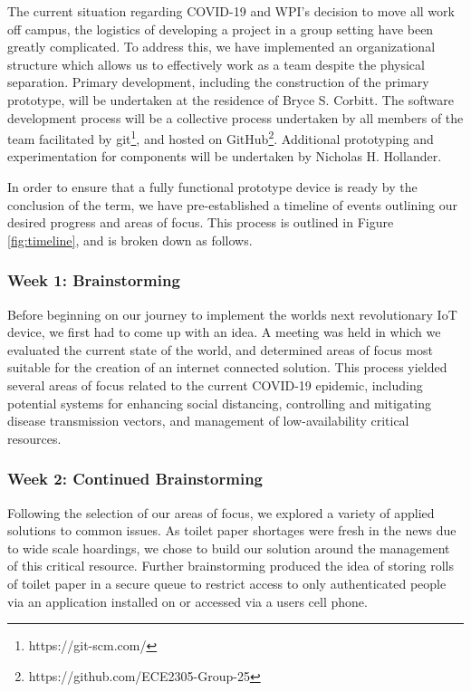 
\par The current situation regarding COVID-19 and WPI's decision to move all work off campus, the logistics of developing a project in a group setting have been greatly complicated.  To address this, we have implemented an organizational structure which allows us to effectively work as a team despite the physical separation.  Primary development, including the construction of the primary prototype, will be undertaken at the residence of Bryce S. Corbitt.  The software development process will be a collective process undertaken by all members of the team facilitated by git\footnote{https://git-scm.com/}, and hosted on GitHub\footnote{https://github.com/ECE2305-Group-25}.  Additional prototyping and experimentation for components will be undertaken by Nicholas H. Hollander.

\par In order to ensure that a fully functional prototype device is ready by the conclusion of the term, we have pre-established a timeline of events outlining our desired progress and areas of focus.  This process is outlined in Figure \ref{fig:timeline}, and is broken down as follows.


\subsubsection*{Week 1: Brainstorming}
\par Before beginning on our journey to implement the worlds next revolutionary IoT device, we first had to come up with an idea.  A meeting was held in which we evaluated the current state of the world, and determined areas of focus most suitable for the creation of an internet connected solution.  This process yielded several areas of focus related to the current COVID-19 epidemic, including potential systems for enhancing social distancing, controlling and mitigating disease transmission vectors, and management of low-availability critical resources.

\subsubsection*{Week 2: Continued Brainstorming}
\par Following the selection of our areas of focus, we explored a variety of applied solutions to common issues.  As toilet paper shortages were fresh in the news due to wide scale hoardings, we chose to build our solution around the management of this critical resource.  Further brainstorming produced the idea of storing rolls of toilet paper in a secure queue to restrict access to only authenticated people via an application installed on or accessed via a users cell phone.

